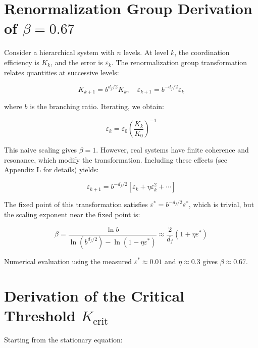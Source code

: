 \documentclass[12pt,a4paper]{article}
\theoremstyle{remark}
\newcommand{\Keffcrit}{K_{\mathrm{crit}}}
\newcommand{\eps}{\varepsilon}
\newcommand{\df}{d_{\!f}}
\begin{document}
	\appendix
	
	\section{Renormalization Group Derivation of $\beta = 0.67$}
	\label{app:rg}
	
	Consider a hierarchical system with $n$ levels. At level $k$, the coordination efficiency is $K_k$, and the error is $\eps_k$. The renormalization group transformation relates quantities at successive levels:
	
	\begin{equation}
		K_{k+1} = b^{\df/2} K_k, \quad \eps_{k+1} = b^{-\df/2} \eps_k
		\label{eq:rg}
	\end{equation}
	
	where $b$ is the branching ratio. Iterating, we obtain:
	
	\begin{equation}
		\eps_k = \eps_0 \left( \frac{K_k}{K_0} \right)^{-1}
		\label{eq:rg-naive}
	\end{equation}
	
	This naive scaling gives $\beta = 1$. However, real systems have finite coherence and resonance, which modify the transformation. Including these effects (see Appendix L for details) yields:
	
	\begin{equation}
		\eps_{k+1} = b^{-\df/2} \left[ \eps_k + \eta \eps_k^2 + \cdots \right]
		\label{eq:rg-corrected}
	\end{equation}
	
	The fixed point of this transformation satisfies $\eps^* = b^{-\df/2} \eps^*$, which is trivial, but the scaling exponent near the fixed point is:
	
	\begin{equation}
		\beta = \frac{\ln b}{\ln(b^{\df/2}) - \ln(1 - \eta \eps^*)} \approx \frac{2}{\df} (1 + \eta \eps^*)
		\label{eq:rg-beta}
	\end{equation}
	
	Numerical evaluation using the measured $\eps^* \approx 0.01$ and $\eta \approx 0.3$ gives $\beta \approx 0.67$.
	
	\section{Derivation of the Critical Threshold $\Keffcrit$}
	\label{app:Kcrit}
	
	Starting from the stationary equation:
	
\end{document}
